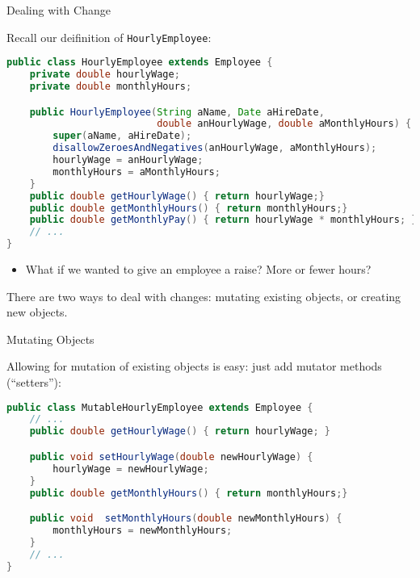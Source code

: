 \documentclass{beamer}
\author[Chris Simpkins] 
{Christopher Simpkins \\\texttt{chris.simpkins@gatech.edu}}
\institute[Georgia Tech] %
\date[CS 1331]{}
\title[\course] %
{\lesson}
\subtitle{}
\begin{document}
\begin{frame}
  \titlepage
\end{frame}


\begin{frame}[fragile]{Dealing with Change}


Recall our deifinition of {\tt HourlyEmployee}:
\begin{lstlisting}[language=Java]
public class HourlyEmployee extends Employee {
    private double hourlyWage;
    private double monthlyHours;

    public HourlyEmployee(String aName, Date aHireDate,
                          double anHourlyWage, double aMonthlyHours) {
        super(aName, aHireDate);
        disallowZeroesAndNegatives(anHourlyWage, aMonthlyHours);
        hourlyWage = anHourlyWage;
        monthlyHours = aMonthlyHours;
    }
    public double getHourlyWage() { return hourlyWage;}
    public double getMonthlyHours() { return monthlyHours;}
    public double getMonthlyPay() { return hourlyWage * monthlyHours; }
    // ...
}
\end{lstlisting}

\begin{itemize}
\item What if we wanted to give an employee a raise?  More or fewer hours?
\end{itemize}

There are two ways to deal with changes: mutating existing objects, or creating new objects.
\end{frame}

\begin{frame}[fragile]{Mutating Objects}


Allowing for mutation of existing objects is easy: just add mutator methods (``setters''):
\begin{lstlisting}[language=Java]
public class MutableHourlyEmployee extends Employee {
    // ...
    public double getHourlyWage() { return hourlyWage; }

    public void setHourlyWage(double newHourlyWage) {
        hourlyWage = newHourlyWage;
    }
    public double getMonthlyHours() { return monthlyHours;}

    public void  setMonthlyHours(double newMonthlyHours) {
        monthlyHours = newMonthlyHours;
    }
    // ...
}
\end{lstlisting}

\end{frame}
\end{document}
